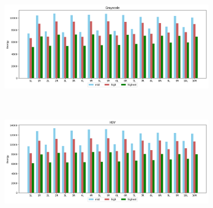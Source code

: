 \begin{figure}[H]
    \caption{Coin "v" STFT approach with Blackmanharris window for Grayscale (a) and HSV (b) colourspaces.}
    \centering
    \begin{subfigure}{\textwidth}
        \centering
        \includegraphics[scale=0.5]{images/appendix/stft/coin_v/blackmanharris_Grayscale.png}
        \caption{}
    \end{subfigure}\\
    \begin{subfigure}{\textwidth}
         \centering
          \includegraphics[scale=0.5]{images/appendix/stft/coin_v/blackmanharris_HSV.png}
          \caption{}
    \end{subfigure}
    \fautor
\end{figure}